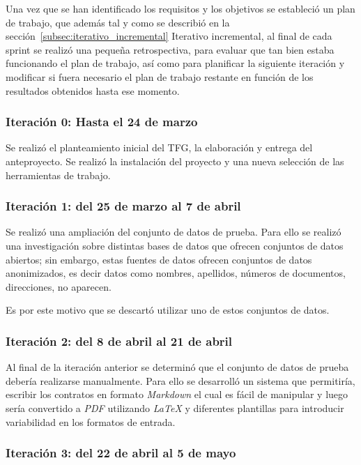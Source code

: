 Una vez que se han identificado los requisitos y los objetivos se estableció un plan de trabajo, que además tal y como
se describió en la sección~\ref{subsec:iterativo_incremental} Iterativo incremental, al final de cada sprint se realizó
una pequeña retrospectiva, para evaluar que tan bien estaba funcionando el plan de trabajo, así como para planificar
la siguiente iteración y modificar si fuera necesario el plan de trabajo restante en función de los resultados obtenidos
hasta ese momento.

\subsubsection*{Iteración 0: Hasta el 24 de marzo}

Se realizó el planteamiento inicial del TFG, la elaboración y entrega del anteproyecto.
Se realizó la instalación del proyecto y una nueva selección de las herramientas de trabajo.

\subsubsection*{Iteración 1: del 25 de marzo al 7 de abril}

Se realizó una ampliación del conjunto de datos de prueba.
Para ello se realizó una investigación sobre distintas bases de datos que ofrecen conjuntos de datos abiertos; sin
embargo, estas fuentes de datos ofrecen conjuntos de datos anonimizados, es decir datos como nombres, apellidos,
números de documentos, direcciones, no aparecen.

Es por este motivo que se descartó utilizar uno de estos conjuntos de datos.

\subsubsection*{Iteración 2: del 8 de abril al 21 de abril}

Al final de la iteración anterior se determinó que el conjunto de datos de prueba debería realizarse manualmente.
Para ello se desarrolló un sistema que permitiría, escribir los contratos en formato \textit{Markdown} el cual es fácil
de manipular y luego sería convertido a \textit{PDF} utilizando \textit{LaTeX} y diferentes plantillas para introducir
variabilidad en los formatos de entrada.

\subsubsection*{Iteración 3: del 22 de abril al 5 de mayo}

